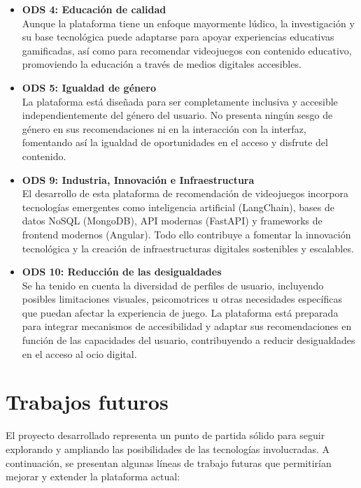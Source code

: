 \begin{itemize}

	
	\item \textbf{ODS 4: Educación de calidad} \\
	Aunque la plataforma tiene un enfoque mayormente lúdico, la investigación y su base tecnológica puede adaptarse para apoyar experiencias educativas gamificadas, así como para recomendar videojuegos con contenido educativo, promoviendo la educación a través de medios digitales accesibles.
	
	\item \textbf{ODS 5: Igualdad de género} \\
	La plataforma está diseñada para ser completamente inclusiva y accesible independientemente del género del usuario. No presenta ningún sesgo de género en sus recomendaciones ni en la interacción con la interfaz, fomentando así la igualdad de oportunidades en el acceso y disfrute del contenido.
	
		\item \textbf{ODS 9: Industria, Innovación e Infraestructura} \\
	El desarrollo de esta plataforma de recomendación de videojuegos incorpora tecnologías emergentes como inteligencia artificial (LangChain), bases de datos NoSQL (MongoDB), API modernas (FastAPI) y frameworks de frontend modernos (Angular). Todo ello contribuye a fomentar la innovación tecnológica y la creación de infraestructuras digitales sostenibles y escalables.
	
	\item \textbf{ODS 10: Reducción de las desigualdades} \\
	Se ha tenido en cuenta la diversidad de perfiles de usuario, incluyendo posibles limitaciones visuales, psicomotrices u otras necesidades específicas que puedan afectar la experiencia de juego. La plataforma está preparada para integrar mecanismos de accesibilidad y adaptar sus recomendaciones en función de las capacidades del usuario, contribuyendo a reducir desigualdades en el acceso al ocio digital.
\end{itemize}


\newpage

\section{Trabajos futuros}

El proyecto desarrollado representa un punto de partida sólido para seguir explorando y ampliando las posibilidades de las tecnologías involucradas. A continuación, se presentan algunas líneas de trabajo futuras que permitirían mejorar y extender la plataforma actual:

